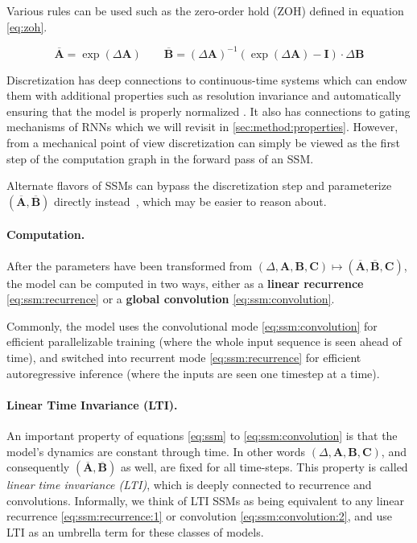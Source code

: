   Various rules can be used such as the zero-order hold (ZOH) defined in equation \eqref{eq:zoh}.

\begin{equation}
    \label{eq:zoh}
    \overline{\bm{A}} = \exp(\Delta \bm{A})
    \qquad
    \overline{\bm{B}} = (\Delta \bm{A})^{-1} (\exp(\Delta \bm{A}) - \bm{I}) \cdot \Delta \bm{B}
  \end{equation}

Discretization has deep connections to continuous-time systems which can endow them with additional properties such as resolution invariance \citep{nguyen2022s4nd} and automatically ensuring that the model is properly normalized \citep{gu2023train,orvieto2023resurrecting}.
It also has connections to gating mechanisms of RNNs \citep{tallec2018can,gu2020improving} which we will revisit in \ref{sec:method:properties}.
However, from a mechanical point of view discretization can simply be viewed as the first step of the computation graph in the forward pass of an SSM.

  Alternate flavors of SSMs can bypass the discretization step and parameterize $(\overline{\bm{A}}, \overline{\bm{B}})$ directly instead~\citep{zhang2023effectively}, which may be easier to reason about.

\paragraph{Computation.}
After the parameters have been transformed from $(\Delta, \bm{A}, \bm{B}, \bm{C}) \mapsto (\overline{\bm{A}}, \overline{\bm{B}}, \bm{C})$,
the model can be computed in two ways, either as a \textbf{linear recurrence} \eqref{eq:ssm:recurrence} or a \textbf{global convolution} \eqref{eq:ssm:convolution}.

Commonly, the model uses the convolutional mode \eqref{eq:ssm:convolution} for efficient parallelizable training (where the whole input sequence is seen ahead of time), and switched into recurrent mode \eqref{eq:ssm:recurrence} for efficient autoregressive inference (where the inputs are seen one timestep at a time).

\paragraph{Linear Time Invariance (LTI).} An important property of equations \eqref{eq:ssm} to \eqref{eq:ssm:convolution} is that the model's dynamics are constant through time. In other words $(\Delta, \bm{A}, \bm{B}, \bm{C})$, and consequently $(\overline{\bm{A}}, \overline{\bm{B}})$ as well, are fixed for all time-steps. This property is called \emph{linear time invariance (LTI)}, which is deeply connected to recurrence and convolutions. Informally, we think of LTI SSMs as being equivalent to any linear recurrence \eqref{eq:ssm:recurrence:1} or convolution \eqref{eq:ssm:convolution:2},
and use LTI as an umbrella term for these classes of models.

